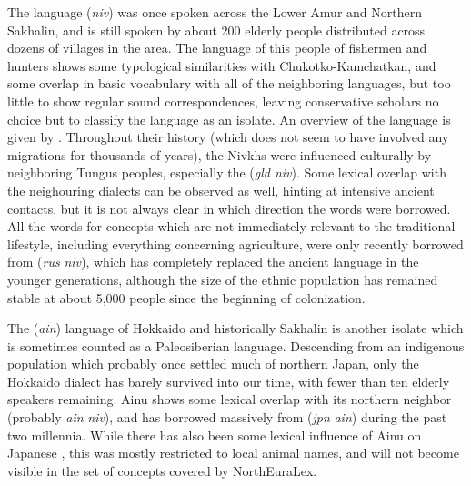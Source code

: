 The  language (\textit{niv}) was once spoken across the Lower Amur and Northern Sakhalin, and is still spoken by about 200 elderly people distributed across dozens of villages in the area. The language of this people of fishermen and hunters shows some typological similarities with Chukotko-Kamchatkan, and some overlap in basic vocabulary with all of the neighboring languages, but too little to show regular sound correspondences, leaving conservative scholars no choice but to classify the language as an isolate. An overview of the language is given by \cite{gruzdeva1998}. Throughout their history (which does not seem to have involved any migrations for thousands of years), the Nivkhs were influenced culturally by neighboring Tungus peoples, especially the  (\textit{gld \arrowLA niv}). Some lexical overlap with the neighouring  dialects can be observed as well, hinting at intensive ancient contacts, but it is not always clear in which direction 
the words were borrowed. All the words for concepts which are not immediately relevant to the traditional lifestyle, including everything concerning agriculture, were only recently borrowed from  (\textit{rus} \arrowLA \textit{niv}), which has completely replaced the ancient language in the younger generations, although the size of the ethnic population has remained stable at about 5,000 people since the beginning of colonization.

The  (\textit{ain}) language of Hokkaido and historically Sakhalin is another isolate which is sometimes counted as a Paleosiberian language. Descending from an indigenous population which probably once settled much of northern Japan, only the Hokkaido dialect has barely survived into our time, with fewer than ten elderly speakers remaining. Ainu shows some lexical overlap with its northern neighbor  (probably \textit{ain} \arrowLA \textit{niv}), and has borrowed massively from  (\textit{jpn} \arrowLA \textit{ain}) during the past two millennia. While there has also been some lexical influence of Ainu on Japanese \citep{schmidt2009}, this was mostly restricted to local animal names, and will not become visible in the set of concepts covered by NorthEuraLex.

